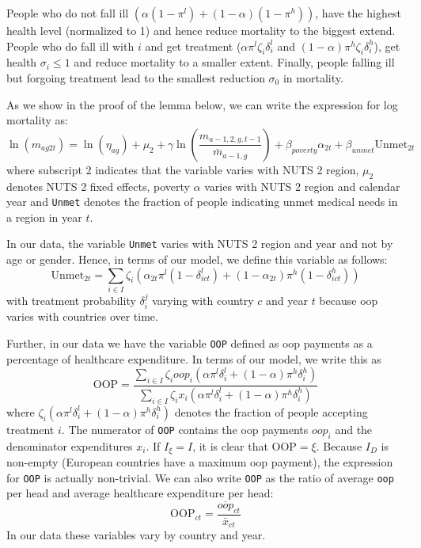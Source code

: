 \documentclass[a4paper,12pt]{article}
\begin{document}
People who do not fall ill \((\alpha(1-\pi^l)+(1-\alpha)(1-\pi^h))\), have the highest health level (normalized to 1) and hence reduce mortality to the biggest extend. People who do fall ill with \(i\) and get treatment (\(\alpha \pi^l \zeta_i \delta_i^l\) and \((1-\alpha)\pi^h \zeta_i \delta_i^h\)), get health \(\sigma_i \leq 1\) and reduce mortality to a smaller extent. Finally, people falling ill but forgoing treatment lead to the smallest reduction \(\sigma_0\) in mortality.

As we show in the proof of the lemma below, we can write the expression for log mortality as:
\begin{equation}
\label{eq:health2}
\ln(m_{ag2t}) =\ln ( \eta_{ag}) + \mu_2 + \gamma \ln \left( \frac{m_{a-1,2,g,t-1}}{\bar m_{a-1,g}}\right) + \beta_{poverty}\alpha_{2t} + \beta_{unmet}\text{Unmet}_{2t}
\end{equation}
where subscript \(2\) indicates that the variable varies with NUTS 2 region, \(\mu_2\) denotes NUTS 2 fixed effects, poverty \(\alpha\) varies with NUTS 2 region and calendar year and \texttt{Unmet} denotes the fraction of people indicating unmet medical needs in a region in year \(t\). 

In our data, the variable \texttt{Unmet} varies with NUTS 2 region and year and not by age or gender. Hence, in terms of our model, we define this variable as follows:
\begin{equation}
\label{eq:Unmet}
\text{Unmet}_{2t} = \sum_{i \in I} \zeta_i (\alpha_{2t} \pi^l (1-\delta^l_{ict}) + (1-\alpha_{2t}) \pi^h (1-\delta^h_{ict}))
\end{equation}
with treatment probability \(\delta^j_i\) varying with country \(c\) and year \(t\) because oop varies with countries over time.

Further, in our data we have the variable \texttt{OOP}  defined as oop payments as a percentage of healthcare expenditure. In terms of our model, we write this as
\begin{equation}
\label{eq:OOP}
\text{OOP} = \frac{\sum_{i \in I} \zeta_i oop_i (\alpha \pi^l \delta^l_i + (1-\alpha) \pi^h \delta^h_i)}{\sum_{i \in I} \zeta_i x_i (\alpha \pi^l \delta_i^l + (1-\alpha) \pi^h \delta_i^h) }
\end{equation}
where \(\zeta_i (\alpha \pi^l \delta^l_i + (1-\alpha) \pi^h \delta^h_i)\) denotes the fraction of people accepting treatment \(i\). The numerator of \texttt{OOP} contains the oop payments \(oop_{i}\) and the denominator expenditures \(x_i\). If \(I_{\xi} = I\), it is clear that \(\text{OOP} = \xi\). Because \(I_D\) is non-empty (European countries have a maximum oop payment), the expression for \texttt{OOP} is actually non-trivial. We can also write \texttt{OOP} as the ratio of average \texttt{oop} per head and average healthcare expenditure per head:
\begin{equation}
\label{eq:OOP2}
\text{OOP}_{ct} = \frac{\overline{oop}_{ct}}{\bar{x}_{ct}}
\end{equation}
In our data these variables vary by country and year.
\end{document}

